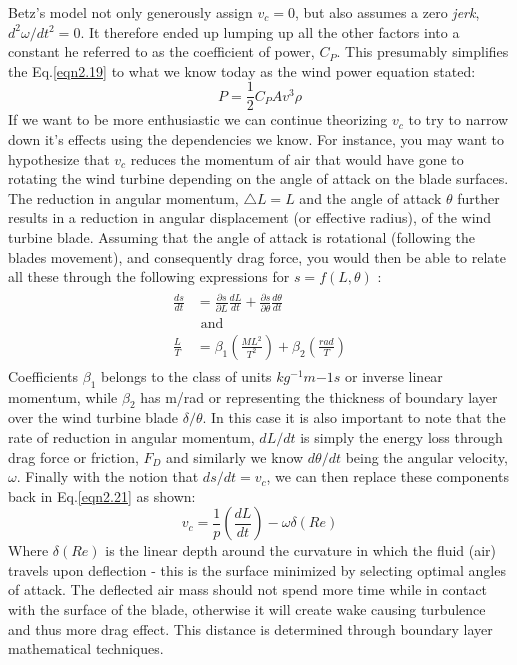 \noindent Betz's model not only generously assign $v_c=0$, but also assumes a zero \emph{jerk}, $d^2\omega/dt^2=0$. It therefore ended up lumping up all the other factors into a constant he referred to as the coefficient of power, $C_P$. This presumably  simplifies the Eq.\eqref{eqn2.19} to what we know today as the wind power equation stated:
\begin{equation} 
P = \frac{1}{2}C_PAv^3\rho
\label{eqn2.20}
\end{equation}  
\noindent If we want to be more enthusiastic we can continue theorizing $v_c$ to try to narrow down it's effects using the dependencies we know. For instance, you may want to hypothesize that $v_c$ reduces the momentum of air that would have gone to rotating the wind turbine depending on the angle of attack on the blade surfaces. The reduction in angular momentum, $\bigtriangleup L = L$ and the angle of attack $\theta$ further results in a reduction in angular displacement (or effective radius), of the wind turbine blade. Assuming that the angle of attack is rotational (following the blades movement), and consequently drag force, you would then be able to relate all these through the following expressions for $s =f\left(L,\theta \right)$ :
\begin{eqnarray}
\begin{split}
\frac{ds}{dt} &= \frac{\partial s}{\partial L}\frac{dL}{dt}+\frac{\partial s}{\partial \theta}\frac{d\theta}{dt}\\
&\text{ and }\\
\frac{L}{T} &= \beta_1 \left( \frac{ML^2}{T^2}\right) +\beta_2 \left( \frac{rad}{T}\right) 
\label{eqn2.21}
\end{split}
\end{eqnarray}     
\noindent Coefficients $\beta_1$ belongs to the class of units $kg^{-1}m{-1}s$ or inverse linear momentum, while $\beta_2$ has m/rad or representing the thickness of boundary layer over the wind turbine blade $\delta/\theta$. In this case it is also important to note that the rate of reduction in angular momentum, $dL/dt$ is simply the energy loss through drag force or friction, $F_D$ and similarly we know $d\theta/dt$ being the angular velocity, $\omega$. Finally with the notion that $ds/dt = v_c$, we can then replace these components back in Eq.\eqref{eqn2.21} as shown:
\begin{equation}
v_c = \frac{1}{p}\left(\frac{dL}{dt} \right)  - \omega \delta \left(Re\right) 
\label{eqn2.22}
\end{equation}
\noindent Where $\delta\left(Re\right)$ is the linear depth around the curvature in which the fluid (air) travels upon deflection - this is the surface minimized by selecting optimal angles of attack. The deflected air mass should not spend more time while in contact with the surface of the blade, otherwise it will create wake causing turbulence and thus more drag effect. This distance is determined through boundary layer mathematical techniques. 


